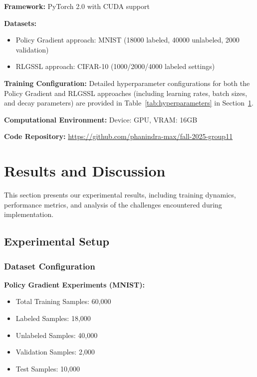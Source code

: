 \documentclass{scrartcl}
\begin{document}
\textbf{Framework:} PyTorch 2.0 with CUDA support

\textbf{Datasets:}
\begin{itemize}
    \item Policy Gradient approach: MNIST (18000 labeled, 40000 unlabeled, 2000 validation)
    \item RLGSSL approach: CIFAR-10 (1000/2000/4000 labeled settings)
\end{itemize}

\textbf{Training Configuration:} Detailed hyperparameter configurations for both the Policy Gradient and RLGSSL approaches (including learning rates, batch sizes, and decay parameters) are provided in Table~\ref{tab:hyperparameters} in Section~\ref{sec:results}.

\textbf{Computational Environment:} Device: GPU, VRAM: 16GB

\textbf{Code Repository:} \url{https://github.com/phanindra-max/fall-2025-group11}


\section{Results and Discussion}
\label{sec:results}

This section presents our experimental results, including training dynamics, performance metrics, and analysis of the challenges encountered during implementation.

\subsection{Experimental Setup}

\subsubsection{Dataset Configuration}

\textbf{Policy Gradient Experiments (MNIST):}
\begin{itemize}
    \item Total Training Samples: 60,000
    \item Labeled Samples: 18,000
    \item Unlabeled Samples: 40,000
    \item Validation Samples: 2,000
    \item Test Samples: 10,000
\end{itemize}
\end{document}
